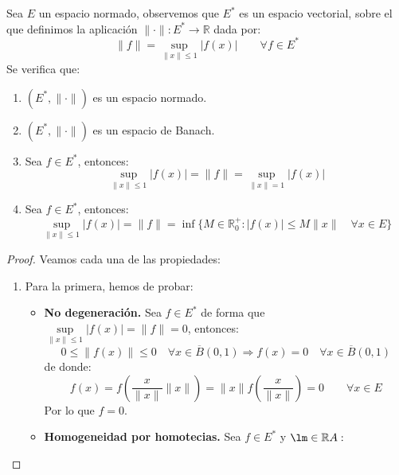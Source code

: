 \begin{prop}
    Sea $E$ un espacio normado, observemos que $E^\ast$ es un espacio vectorial, sobre el que definimos la aplicación $\|\cdot \|:E^\ast \to \mathbb{R}$ dada por:
    \begin{equation*}
        \|f\| = \sup_{\|x\| \leq 1} |f(x)| \qquad \forall f\in E^\ast
    \end{equation*}
    Se verifica que:
    \begin{enumerate}
        \item $(E^\ast, \|\cdot \|)$ es un espacio normado.
        \item $(E^\ast, \|\cdot \|)$ es un espacio de Banach.
        \item Sea $f\in E^\ast$, entonces:
            \begin{equation*}
                \sup_{\|x\|\leq 1}|f(x)| = \|f\| = \sup_{\|x\|=1}|f(x)|
            \end{equation*}
        \item Sea $f\in E^\ast$, entonces:
            \begin{equation*}
                \sup_{\|x\| \leq 1} |f(x)| = \|f\| = \inf \{M\in \mathbb{R}^+_0 : |f(x)| \leq M\|x\| \quad \forall x\in E\}
            \end{equation*}
    \end{enumerate}
    \begin{proof}
        Veamos cada una de las propiedades:
        \begin{enumerate}
            \item Para la primera, hemos de probar:
                \begin{itemize}
                    \item \textbf{No degeneración.} Sea $f\in E^\ast$ de forma que $\sup\limits_{\|x\|\leq 1}|f(x)| = \|f\| = 0$, entonces:
                        \begin{equation*}
                            0\leq \|f(x)\|\leq 0 \quad \forall x\in \overline{B}(0,1) \Longrightarrow f(x) = 0 \quad \forall x\in \overline{B}(0,1)
                        \end{equation*}
                        de donde:
                        \begin{equation*}
                            f(x) = f\left(\dfrac{x}{\|x\|}\|x\|\right) = \|x\| f\left(\dfrac{x}{\|x\|}\right) = 0 \qquad \forall x\in E
                        \end{equation*}
                        Por lo que $f = 0$.
                    \item \textbf{Homogeneidad por homotecias.} Sea $f\in E^\ast$ y $\lm\in \mathbb{R}A:$

\end{itemize}
\end{enumerate}
\end{proof}
\end{prop}
